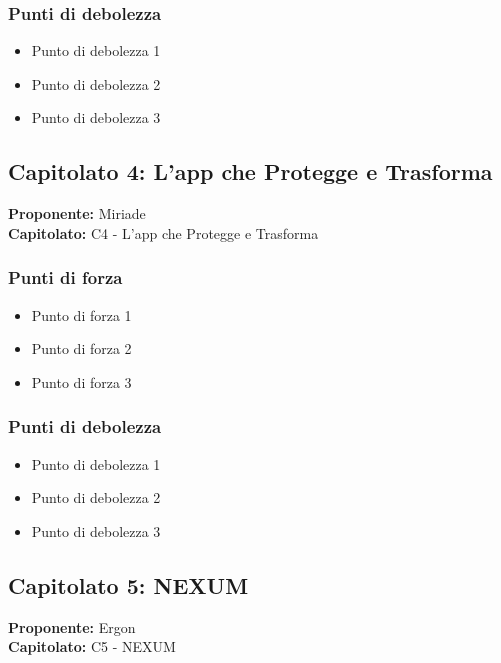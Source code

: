 \documentclass[a4paper,12pt]{article}
\begin{document}
\subsubsection{Punti di debolezza}
\begin{itemize}
\item Punto di debolezza 1
\item Punto di debolezza 2
\item Punto di debolezza 3
\end{itemize}

\subsection{Capitolato 4: L'app che Protegge e Trasforma}

\begin{tcolorbox}[colback=lightgray!30,colframe=darkgray,arc=2mm,boxrule=0.3pt]
\textbf{Proponente:} Miriade \\
\textbf{Capitolato:} C4 - L'app che Protegge e Trasforma
\end{tcolorbox}

\subsubsection{Punti di forza}
\begin{itemize}
\item Punto di forza 1
\item Punto di forza 2
\item Punto di forza 3
\end{itemize}

\subsubsection{Punti di debolezza}
\begin{itemize}
\item Punto di debolezza 1
\item Punto di debolezza 2
\item Punto di debolezza 3
\end{itemize}

\subsection{Capitolato 5: NEXUM}

\begin{tcolorbox}[colback=lightgray!30,colframe=darkgray,arc=2mm,boxrule=0.3pt]
\textbf{Proponente:} Ergon \\
\textbf{Capitolato:} C5 - NEXUM
\end{tcolorbox}
\end{document}
